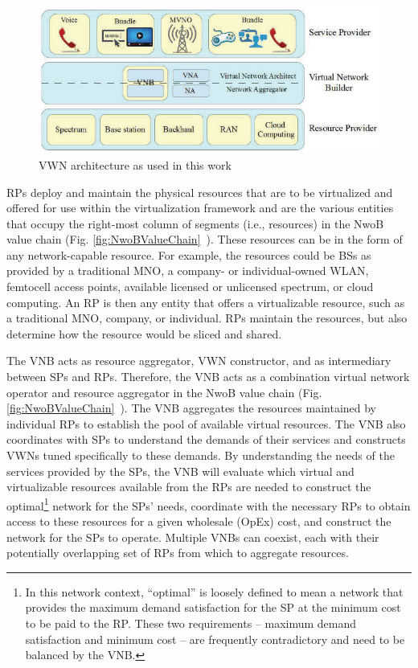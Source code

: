 \documentclass[12pt,dvipsnames]{report}
\begin{document}
\begin{figure}
	\centering
	\includegraphics[width=\linewidth]{VWNArchitecture}
	\caption[VWN architecture as used in this work]{\small VWN architecture as used in this work~\cite{MJ_CCNC_16, MJ_MECOMM_17}}
	\label{fig:VWNArchitecture}
\end{figure}

RPs deploy and maintain the physical resources that are to be virtualized and offered for use within the virtualization framework and are the various entities that occupy the right-most column of segments (i.e., resources) in the NwoB value chain (Fig. \ref{fig:NwoBValueChain}~\cite{6737248}).  These resources can be in the form of any network-capable resource.  For example, the resources could be BSs as provided by a traditional MNO, a company- or individual-owned WLAN, femtocell access points, available licensed or unlicensed spectrum, or cloud computing.  An RP is then any entity that offers a virtualizable resource, such as a traditional MNO, company, or individual.  RPs maintain the resources, but also determine how the resource would be sliced and shared.

The VNB acts as resource aggregator, VWN constructor, and as intermediary between SPs and RPs.  Therefore, the VNB acts as a combination virtual network operator and resource aggregator in the NwoB value chain (Fig. \ref{fig:NwoBValueChain}~\cite{6737248}).  The VNB aggregates the resources maintained by individual RPs to establish the pool of available virtual resources.  The VNB also coordinates with SPs to understand the demands of their services and constructs VWNs tuned specifically to these demands.  By understanding the needs of the services provided by the SPs, the VNB will evaluate which virtual and virtualizable resources available from the RPs are needed to construct the optimal\footnote{In this network context, ``optimal'' is loosely defined to mean a network that provides the maximum demand satisfaction for the SP at the minimum cost to be paid to the RP.  These two requirements -- maximum demand satisfaction and minimum cost -- are frequently contradictory and need to be balanced by the VNB.} network for the SPs' needs, coordinate with the necessary RPs to obtain access to these resources for a given wholesale (OpEx) cost, and construct the network for the SPs to operate.  Multiple VNBs can coexist, each with their potentially overlapping set of RPs from which to aggregate resources.
\end{document}
